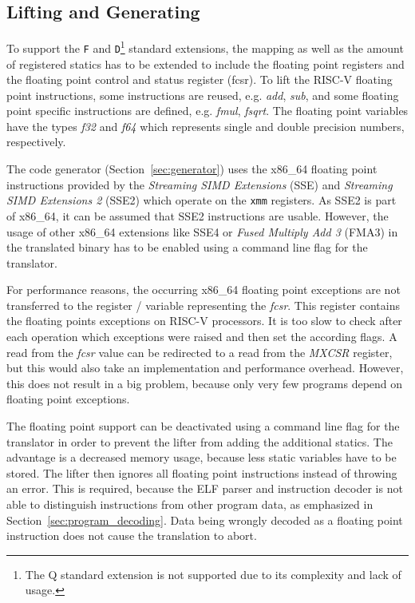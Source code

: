 \documentclass[course=eragp]{aspdoc}
\begin{document}
\subsection{Lifting and Generating}

To support the \texttt{F} and \texttt{D}\footnote{The Q standard extension is not supported due to
    its complexity and lack of usage.}
standard extensions, the mapping as well as the amount of registered statics has to be extended to include the
floating point registers and the floating point control and status register (fcsr). To lift the
RISC-V floating point instructions, some instructions are reused, e.g. \emph{add}, \emph{sub}, and some floating
point specific instructions are defined, e.g. \emph{fmul}, \emph{fsqrt}. The floating point variables have the
types \emph{f32} and \emph{f64} which represents single and double precision numbers, respectively.

\par

The code generator (Section~\ref{sec:generator}) uses the x86\_64 floating point instructions
provided by the \textit{Streaming SIMD Extensions} (SSE) and \textit{Streaming SIMD Extensions 2}
(SSE2) which operate on the \texttt{xmm} registers. As SSE2 is part of x86\_64, it can be assumed
that SSE2 instructions are usable. However, the usage of other x86\_64 extensions like SSE4 or
\textit{Fused Multiply Add 3} (FMA3) in the translated binary has to be enabled using a command line
flag for the translator.

\par

For performance reasons, the occurring x86\_64 floating point exceptions are not transferred to
the register / variable representing the \emph{fcsr}. This register contains the floating points exceptions on RISC-V
processors. It is too slow to check after each operation which exceptions were raised and then set
the according flags. A read from the \emph{fcsr} value can be redirected to a read from the \textit{MXCSR}
register, but this would also take an implementation and performance overhead. However, this does
not result in a big problem, because only very few programs depend on floating point exceptions.

\par

The floating point support can be deactivated using a command line flag for the translator in order to prevent the
lifter from adding the additional statics. The
advantage is a decreased memory usage, because less static variables have to be stored. The lifter
then ignores all floating point instructions instead of throwing an error. This is required,
because the ELF parser and instruction decoder is not able to distinguish instructions from other
program data, as emphasized in Section~\ref{sec:program_decoding}. Data being wrongly decoded as a
floating point instruction does not cause the translation to abort.
\end{document}
